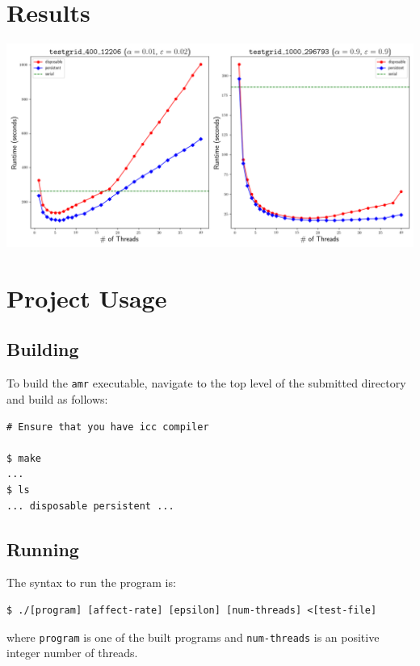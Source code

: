 \documentclass{article}
\begin{document}
\newpage
\section*{Results}
\label{sec:results}

\begin{minipage}{\linewidth}
    \centering
    \includegraphics[width=\linewidth]{../results/tests_results.png}
    \label{fig:runtimes}
\end{minipage}

\section*{Project Usage}
\label{sec:project}

\subsection*{Building}
\label{subsec:building}

To build the \texttt{amr} executable, navigate to the top level of the
submitted directory and build as follows:

\begin{lstlisting}[style=DOS]
# Ensure that you have icc compiler

$ make
...
$ ls
... disposable persistent ...
\end{lstlisting}

\subsection*{Running}
\label{subsec:running}

The syntax to run the program is:

\begin{lstlisting}[style=DOS]
$ ./[program] [affect-rate] [epsilon] [num-threads] <[test-file]
\end{lstlisting}

where \texttt{program} is one of the built programs and \texttt{num-threads} is
an positive integer number of threads.
\end{document}
